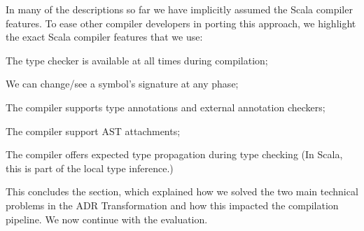 In many of the descriptions so far we have implicitly assumed the Scala compiler features. To ease other compiler developers in porting this approach, we highlight the exact Scala compiler features that we use:

\vspace{0.3em}
\begin{compactitem}
  \item The type checker is available at all times during compilation;
  \item We can change/see a symbol's signature at any phase;
  \item The compiler supports type annotations and external annotation checkers;
  \item The compiler support AST attachments;
  \item The compiler offers expected type propagation during type checking (In Scala, this is part of the local type inference.)
\end{compactitem}
\vspace{0.3em}

This concludes the section, which explained how we solved the two main technical problems in the ADR Transformation and how this impacted the compilation pipeline. We now continue with the evaluation.
